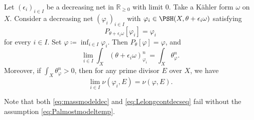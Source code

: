 \begin{proposition}\label{prop:vol_limit_model}
    Let $(\epsilon_i)_{i\in I}$ be a decreasing net in $\mathbb{R}_{\geq 0}$ with limit $0$. Take a Kähler form $\omega$ on $X$.
    Consider a decreasing net $(\varphi_i)_{i\in I}$ with $\varphi_i\in \PSH(X,\theta+\epsilon_i \omega)$ satisfying
    \begin{equation}\label{eq:Palmostmodeltemp}
        P_{\theta+\epsilon_i\omega}\left[\varphi_i\right]=\varphi_i
    \end{equation}
    for every $i\in I$. Set $\varphi\coloneqq\inf_{i\in I}\varphi_i$. Then $P_{\theta}[\varphi]=\varphi$, and
    \begin{equation}\label{eq:massmodeldec}
    \lim_{i\in I}\int_X \left(\theta + \epsilon_i \omega\right)^n_{\varphi_i}=\int_X \theta_{\varphi}^n.
    \end{equation}
    Moreover, if $\int_X \theta_{\varphi}^n>0$, then for any prime divisor $E$ over $X$, we have
    \begin{equation}\label{eq:Lelongcontdecseq}
    \lim_{i\in I} \nu\left(\varphi_i,E\right)=\nu(\varphi,E).
    \end{equation}
\end{proposition}
Note that both \eqref{eq:massmodeldec} and \eqref{eq:Lelongcontdecseq} fail without the assumption \eqref{eq:Palmostmodeltemp}.


